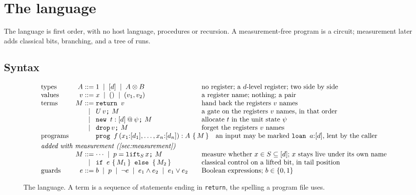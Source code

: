 \documentclass[acmsmall,screen,review,anonymous,nonacm]{acmart}
\begin{document}
\section{The language}\label{sec:language}

The language is first order, with no host language, procedures or
recursion. A measurement-free program is a circuit; measurement later
adds classical bits, branching, and a tree of runs.

\subsection{Syntax}\label{sec:lang:syntax}
\begin{figure}
\centering\footnotesize
\[
\begin{array}{@{}l@{\quad}r@{\;}c@{\;}l@{\qquad}l@{}}
\text{types} & A & ::= & 1 \;\mid\; [d] \;\mid\; A \otimes B
  & \text{no register; a } d\text{-level register; two side by side}\\
\text{values} & v & ::= & x \;\mid\; () \;\mid\; (v_1, v_2)
  & \text{a register name; nothing; a pair}\\
\text{terms} & M & ::= & \texttt{return } v & \text{hand back the registers } v \text{ names}\\
 & & \mid & U\,v\texttt{;}\ M & \text{a gate on the registers } v \text{ names, in that order}\\
 & & \mid & \texttt{new } t : [d] \mathbin{@} \psi\texttt{;}\ M & \text{allocate } t \text{ in the unit state } \psi\\
 & & \mid & \drop\,v\texttt{;}\ M & \text{forget the registers } v \text{ names}\\
\text{programs} & & & \multicolumn{2}{@{}l}{\texttt{prog } f\,(x_1{:}[d_1], \ldots, x_n{:}[d_n]) : A\ \{\,M\,\}\quad\text{an input may be marked } \texttt{loan } a{:}[d]\text{, lent by the caller}}\\[3pt]
\multicolumn{5}{@{}l}{\textit{added with measurement (\cref{sec:measurement})}}\\
 & M & ::= & \cdots \;\mid\; p = \lift_S\,x\texttt{;}\ M
  & \text{measure whether } x \in S \subseteq [d]\text{; } x \text{ stays live under its own name}\\
 & & \mid & \texttt{if } e\ \{\,M_1\,\}\texttt{ else }\{\,M_2\,\} & \text{classical control on a lifted bit, in tail position}\\
\text{guards} & e & ::= & b \;\mid\; p \;\mid\; \neg e \;\mid\; e_1 \wedge e_2 \;\mid\; e_1 \vee e_2
  & \text{Boolean expressions; } b\in\{0,1\}
\end{array}
\]
\caption{The language. A term is a sequence of statements ending in
\texttt{return}, the spelling a program file uses.}
\label{fig:syntax}
\end{figure}
\end{document}
